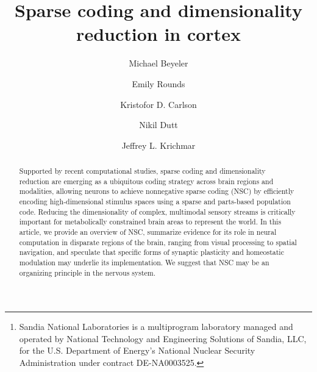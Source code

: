 \documentclass[review,12pt,sort&compress,openany,oneside]{elsarticle}
\begin{document}
\begin{frontmatter}

\title{Sparse coding and dimensionality reduction in cortex}

\author[UCI,UW]{Michael Beyeler}
\author[UCI]{Emily Rounds}
\author[Sandia]{Kristofor D. Carlson}
\author[UCI]{Nikil Dutt}
\author[UCI]{Jeffrey L. Krichmar}
%
\address[UCI]{University of California, Irvine, Irvine, CA, USA}
\address[UW]{University of Washington, Seattle, WA, USA}
\address[Sandia]{Sandia National Laboratories\footnote[**]{Sandia National Laboratories is a multiprogram laboratory managed and operated by National Technology and Engineering Solutions of Sandia, LLC, for the U.S. Department of Energy's National Nuclear Security Administration under contract DE-NA0003525.}, Albuquerque, NM, USA}


\begin{abstract}
Supported by recent computational studies, sparse coding and
dimensionality reduction are emerging as a ubiquitous coding strategy 
across brain regions and modalities,
allowing neurons to achieve nonnegative sparse coding (NSC)
by efficiently encoding high-dimensional stimulus spaces
using a sparse and parts-based population code.
Reducing the dimensionality of complex, multimodal sensory streams 
is critically important for metabolically constrained brain areas 
to represent the world.
In this article, we provide an overview of NSC,
summarize evidence for its role in neural computation
in disparate regions of the brain,
ranging from visual processing to spatial navigation,
and speculate that specific forms of synaptic plasticity 
and homeostatic modulation 
may underlie its implementation. 
We  suggest that NSC may be an organizing principle in the nervous system.
\end{abstract}


\end{frontmatter}
\end{document}
